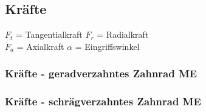 \subsection{Kräfte}
\begin{scriptsize}
    $F_t$ = Tangentialkraft \hfill $F_r$ = Radialkraft
\\$F_a$ = Axialkraft \hfill $\alpha$ = Eingriffswinkel
\end{scriptsize}
\subsubsection{Kräfte - geradverzahntes Zahnrad \hfill ME}
\vspace{-1mm}\begin{minipage}{0.4\linewidth}
    \begin{footnotesize}
        \begin{center}
        \end{center}
    \end{footnotesize}
\end{minipage}
\begin{minipage}{0.58\linewidth}
    \begin{footnotesize}
        \begin{center}
        \end{center}
    \end{footnotesize}
\end{minipage}
\vspace{1mm}
\subsubsection{Kräfte - schrägverzahntes Zahnrad \hfill ME}
\vspace{-1mm}\begin{minipage}{0.4\linewidth}
    \begin{footnotesize}
        \begin{center}
        \end{center}
    \end{footnotesize}
\end{minipage}
\begin{minipage}{0.58\linewidth}
    \begin{footnotesize}
        \begin{center}
          \vspace{-2mm}
        \end{center}
    \end{footnotesize}
\end{minipage}


